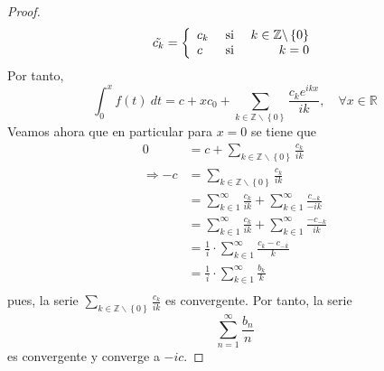 \documentclass[12pt]{report}
\theoremstyle{largebreak}
\begin{document}
\begin{proof}
\begin{equation*}
            \tilde{c_k}=\left\{
                \begin{array}{lcr}
                    c_k & \textup{ si } & k\in\mathbb{Z}\backslash\left\{0\right\}\\
                    c & \textup{ si } & k=0\\
                \end{array}
            \right.
        \end{equation*}
        Por tanto,
        \begin{equation*}
            \int_{0}^{x}f(t)\:dt=c+xc_0+\sum_{ k\in\mathbb{Z}\backslash\left\{0\right\}}\frac{c_ke^{ikx}}{ik},\quad\forall x\in\mathbb{R}
        \end{equation*}
        Veamos ahora que en particular para $x=0$ se tiene que
        \begin{equation*}
            \begin{split}
                0&=c+\sum_{ k\in\mathbb{Z}\backslash\left\{0\right\}}\frac{c_k}{ik}\\
                \Rightarrow -c&=\sum_{ k\in\mathbb{Z}\backslash\left\{0\right\}}\frac{c_k}{ik}\\
                &=\sum_{k\in1}^\infty\frac{c_k}{ik}+\sum_{k\in1}^\infty\frac{c_{-k}}{-ik}\\
                &=\sum_{k\in1}^\infty\frac{c_k}{ik}+\sum_{k\in1}^\infty\frac{-c_{-k}}{ik}\\
                &=\frac{1}{i}\cdot\sum_{k\in1}^\infty\frac{c_k-c_{ -k}}{k}\\
                &=\frac{1}{i}\cdot\sum_{k\in1}^\infty\frac{b_k}{k}\\
            \end{split}
        \end{equation*}
        pues, la serie $\sum_{ k\in\mathbb{Z}\backslash\left\{0\right\}}\frac{c_k}{ik}$ es convergente. Por tanto, la serie
        \begin{equation*}
            \sum_{ n=1}^\infty\frac{b_n}{n}
        \end{equation*}
        es convergente y converge a $-ic$.
    \end{proof}
\end{document}

